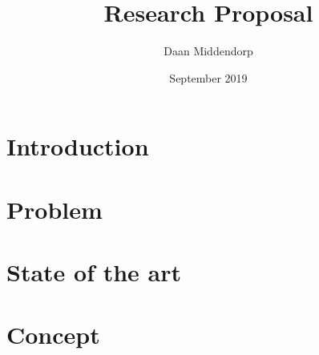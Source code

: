 \documentclass[]{article}
\title{Research Proposal}
\author{Daan Middendorp}
\date{September 2019}
\begin{document}
\maketitle

\begin{abstract}

\end{abstract}

\section{Introduction}

\section{Problem}

\section{State of the art}

\section {Concept}
\end{document}
